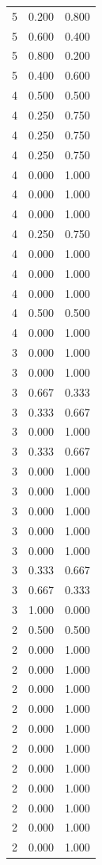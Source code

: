 \begin{tabular}{rrr}
5 & 0.200 & 0.800 \\
5 & 0.600 & 0.400 \\
5 & 0.800 & 0.200 \\
5 & 0.400 & 0.600 \\
4 & 0.500 & 0.500 \\
4 & 0.250 & 0.750 \\
4 & 0.250 & 0.750 \\
4 & 0.250 & 0.750 \\
4 & 0.000 & 1.000 \\
4 & 0.000 & 1.000 \\
4 & 0.000 & 1.000 \\
4 & 0.250 & 0.750 \\
4 & 0.000 & 1.000 \\
4 & 0.000 & 1.000 \\
4 & 0.000 & 1.000 \\
4 & 0.500 & 0.500 \\
4 & 0.000 & 1.000 \\
3 & 0.000 & 1.000 \\
3 & 0.000 & 1.000 \\
3 & 0.667 & 0.333 \\
3 & 0.333 & 0.667 \\
3 & 0.000 & 1.000 \\
3 & 0.333 & 0.667 \\
3 & 0.000 & 1.000 \\
3 & 0.000 & 1.000 \\
3 & 0.000 & 1.000 \\
3 & 0.000 & 1.000 \\
3 & 0.000 & 1.000 \\
3 & 0.333 & 0.667 \\
3 & 0.667 & 0.333 \\
3 & 1.000 & 0.000 \\
2 & 0.500 & 0.500 \\
2 & 0.000 & 1.000 \\
2 & 0.000 & 1.000 \\
2 & 0.000 & 1.000 \\
2 & 0.000 & 1.000 \\
2 & 0.000 & 1.000 \\
2 & 0.000 & 1.000 \\
2 & 0.000 & 1.000 \\
2 & 0.000 & 1.000 \\
2 & 0.000 & 1.000 \\
2 & 0.000 & 1.000 \\
2 & 0.000 & 1.000 \\

\end{tabular}
